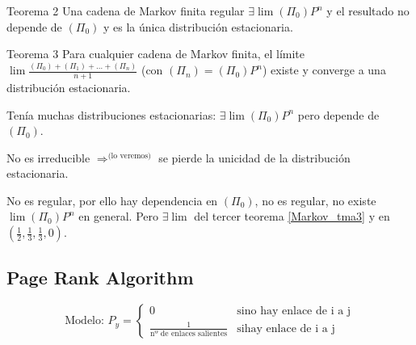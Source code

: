 \begin{theorem}{Teorema 2}
	\label{Markov_tma2}
	Una cadena de Markov finita regular $\exists \lim (\Pi_0) P^n$ y el resultado no depende de $(\Pi_0)$ y es la única distribución estacionaria.
\end{theorem}

\begin{theorem}{Teorema 3}
	\label{Markov_tma3}
	Para cualquier cadena de Markov finita, el límite $\lim \frac{(\Pi_0)+(\Pi_1)+…+(\Pi_n)}{n+1} $ (con $(\Pi_n) = (\Pi_0)P^n$) existe y converge a una distribución estacionaria. 
\end{theorem}


\begin{example}

\begin{figure}[hbtp]
	\centering
\end{figure} 

Tenía muchas distribuciones estacionarias: $\exists \lim(\Pi_0)P^n$ pero depende de $(\Pi_0)$.

No es irreducible $\Rightarrow^{\text{(lo veremos)}}$ se pierde la unicidad de la distribución estacionaria.

\end{example}

\begin{example}

\begin{figure}[h!btp]
	\centering
\end{figure} 

No es regular, por ello hay dependencia en $(\Pi_0)$, no es regular, no existe $\lim(\Pi_0) P^n$ en general. Pero $\exists \lim$ del tercer teorema \ref{Markov_tma3} y en $(\frac{1}{2},\frac{1}{3},\frac{1}{3},0)$.

\end{example}


\subsection{Page Rank Algorithm}

\begin{figure}[hbtp]
	\centering
\end{figure} 


$$\text{Modelo: } P_y = \left\{
	\begin{array}{ll}
		0  & \mbox{si} \text{no hay enlace de i a j} \\
		\frac{1}{\text{nº de enlaces salientes}} & \mbox{si} \text{hay enlace de i a j}
	\end{array}
\right.
$$

